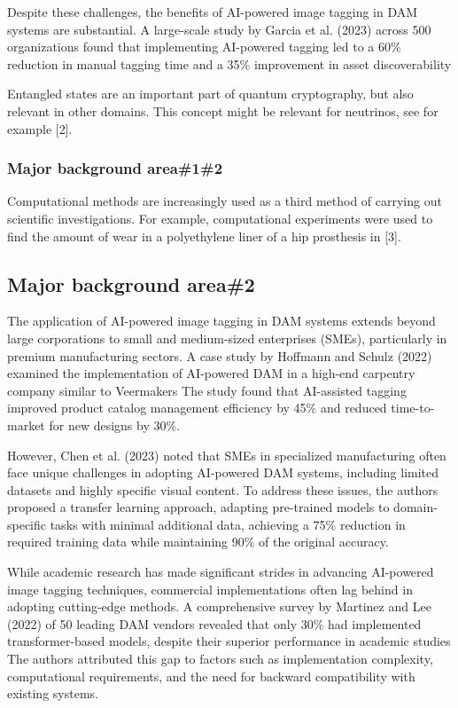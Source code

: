 \documentclass[a4paper,12pt,twocolumn]{article}
\numberwithin{figure}{section}
\numberwithin{table}{section}
\begin{document}
Despite these challenges, the benefits of AI-powered image tagging in DAM systems are substantial. A large-scale study by Garcia et al. (2023)
 across 500 organizations found that implementing AI-powered tagging led to a 60\% reduction in manual tagging time and 
 a 35\% improvement in asset discoverability


Entangled states are an important part of quantum cryptography, but also relevant in other
domains. This concept might be relevant for neutrinos, see for example [2].

\subsubsection{Major background area\#1\#2}
Computational methods are increasingly used as a third method of carrying out scientific
investigations. For example, computational experiments were used to find the amount of wear in a
polyethylene liner of a hip prosthesis in [3].

\subsection{Major background area\#2}
The application of AI-powered image tagging in DAM systems extends beyond large corporations 
to small and medium-sized enterprises (SMEs), particularly in premium manufacturing sectors. A case study 
by Hoffmann and Schulz (2022) examined the implementation of AI-powered DAM in a high-end carpentry 
company similar to Veermakers
The study found that AI-assisted tagging improved product catalog management 
efficiency by 45\% and reduced time-to-market for new designs by 30\%.

However, Chen et al. (2023) noted that SMEs in specialized manufacturing often 
face unique challenges in adopting AI-powered DAM systems, including limited datasets 
and highly specific visual content. 
To address these issues, the authors proposed a transfer learning approach, adapting pre-trained 
models to domain-specific tasks with minimal additional data, achieving a 75\% reduction in required 
training data while maintaining 90\% of the original accuracy.

While academic research has made significant strides in advancing AI-powered image tagging techniques, 
commercial implementations often lag behind in adopting cutting-edge methods. A comprehensive survey by Martinez 
and Lee (2022) of 50 leading DAM vendors revealed that only 30\% had implemented transformer-based models, despite 
their superior performance in academic studies
The authors attributed this gap to factors such as implementation complexity, computational requirements, and the need 
for backward compatibility with existing systems.
\end{document}
